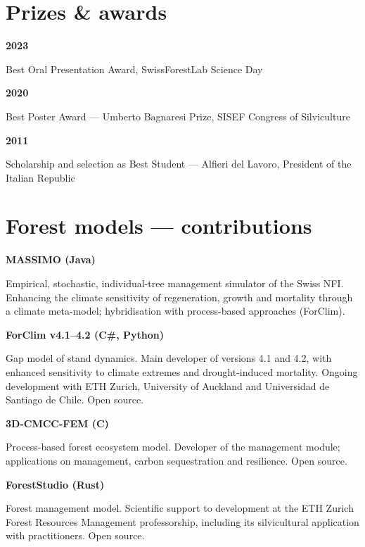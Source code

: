 \documentclass[10pt,a4paper]{article}
\newlength{\dcol}\setlength{\dcol}{3.5cm}
\newcommand{\defrow}[2]{%
  \noindent\begin{minipage}[t]{\dcol}\raggedright\footnotesize\bfseries\color{muted}#1\end{minipage}%
  \hspace{0.45cm}%
  \begin{minipage}[t]{\dimexpr\linewidth-\dcol-0.45cm\relax}\raggedright\small\color{inksoft}#2\end{minipage}\par\vspace{5pt}}
\begin{document}
\section*{Prizes \& awards}
\defrow{2023}{Best Oral Presentation Award, SwissForestLab Science Day}
\defrow{2020}{Best Poster Award --- Umberto Bagnaresi Prize, SISEF Congress of Silviculture}
\defrow{2011}{Scholarship and selection as Best Student --- Alfieri del Lavoro, President of the Italian Republic}

\section*{Forest models --- contributions}
\defrow{MASSIMO \textnormal{(Java)}}{Empirical, stochastic, individual-tree management simulator of the Swiss NFI. Enhancing the climate sensitivity of regeneration, growth and mortality through a climate meta-model; hybridisation with process-based approaches (ForClim).}
\defrow{ForClim v4.1--4.2 \textnormal{(C\#, Python)}}{Gap model of stand dynamics. Main developer of versions 4.1 and 4.2, with enhanced sensitivity to climate extremes and drought-induced mortality. Ongoing development with ETH Zurich, University of Auckland and Universidad de Santiago de Chile. Open source.}
\defrow{3D-CMCC-FEM \textnormal{(C)}}{Process-based forest ecosystem model. Developer of the management module; applications on management, carbon sequestration and resilience. Open source.}
\defrow{ForestStudio \textnormal{(Rust)}}{Forest management model. Scientific support to development at the ETH Zurich Forest Resources Management professorship, including its silvicultural application with practitioners. Open source.}
\end{document}
